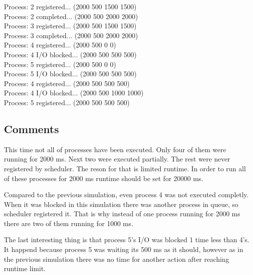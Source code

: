 \documentclass{article}
\begin{document}
Process: 2 registered... (2000 500 1500 1500)\\
Process: 2 completed... (2000 500 2000 2000)\\
Process: 3 registered... (2000 500 1500 1500)\\
Process: 3 completed... (2000 500 2000 2000)\\
Process: 4 registered... (2000 500 0 0)\\
Process: 4 I/O blocked... (2000 500 500 500)\\
Process: 5 registered... (2000 500 0 0)\\
Process: 5 I/O blocked... (2000 500 500 500)\\
Process: 4 registered... (2000 500 500 500)\\
Process: 4 I/O blocked... (2000 500 1000 1000)\\
Process: 5 registered... (2000 500 500 500)

\rmfamily

\subsection{Comments}
This time not all of processes have been executed. Only four of them were
running for 2000 ms. Next two were executed partially. The rest were never registered
by scheduler. The reson for that is limited runtime. In order to run all of these processes
for 2000 ms runtime should be set for 20000 ms.

Compared to the previous simulation, even process 4 was not executed completly.
When it was blocked in this simulation there was another process in queue, so scheduler registered
it. That is why instead of one process running for 2000 ms there are two of them running for
1000 ms.

The last interesting thing is that process 5's I/O was blocked 1 time less than 4's.
It happend because process 5 was waiting its 500 ms as it should, however as in the previous
simulation there was no time for another action after reaching runtime limit.
\end{document}
